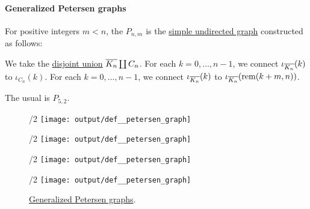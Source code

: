 \paragraph{Generalized Petersen graphs}

\begin{definition}\label{def:petersen_graph}
  For positive integers \( m < n \), the  \( P_{n,m} \) is the \hyperref[def:undirected_graph]{simple undirected graph} constructed as follows:
  \begin{thmenum}
     We take the \hyperref[def:graph_disjoint_union]{disjoint union} \( \oline{K_n} \coprod C_n \).
     For each \( k = 0, \ldots, n - 1 \), we connect \( \iota_{\oline{K_n}}(k) \) to \( \iota_{C_n}(k) \).
     For each \( k = 0, \ldots, n - 1 \), we connect \( \iota_{\oline{K_n}}(k) \) to \( \iota_{\oline{K_n}}(\rem(k + m, n)) \).
  \end{thmenum}

  The usual  is \( P_{5,2} \).

  \begin{figure}[!ht]
    \begin{subcaptionblock}{\textwidth/2}
      \centering
      \texttt{[image: output/def\_\_petersen\_graph]}
      \caption{\( P_{5,2} \)}\label{fig:def:petersen_graph/p52}
    \end{subcaptionblock}
    \hfill
    \begin{subcaptionblock}{\textwidth/2}
      \centering
      \texttt{[image: output/def\_\_petersen\_graph]}
      \caption{\( P_{7,3} \)}\label{fig:def:petersen_graph/p73}
    \end{subcaptionblock}
    \par
    \begin{subcaptionblock}{\textwidth/2}
      \centering
      \texttt{[image: output/def\_\_petersen\_graph]}
      \caption{\( P_{3,1} \)}\label{fig:def:petersen_graph/p31}
    \end{subcaptionblock}
    \hfill
    \begin{subcaptionblock}{\textwidth/2}
      \centering
      \texttt{[image: output/def\_\_petersen\_graph]}
      \caption{\( P_{2,1} \)}\label{fig:def:petersen_graph/p21}
    \end{subcaptionblock}

    \caption{\hyperref[def:petersen_graph]{Generalized Petersen graphs}.}\label{fig:def:petersen_graph}
  \end{figure}
\end{definition}

